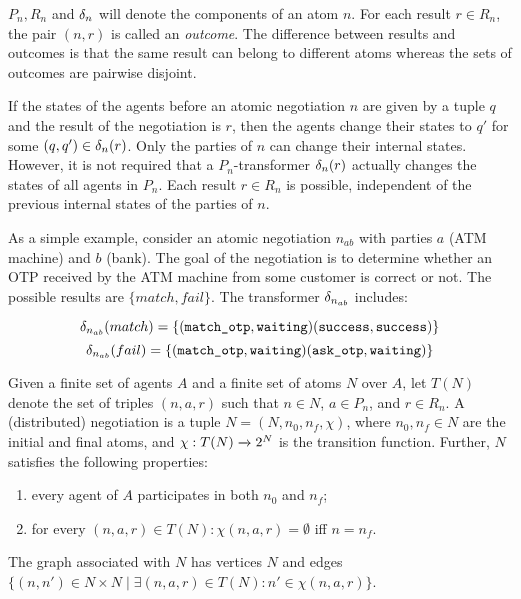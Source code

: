 $P_n, R_n$ and $\delta_n$ will denote the components of an atom $n$. For each result $r \in R_n$, the pair $(n, r)$ is called an \textit{outcome}. The diﬀerence between results and outcomes is that the same result can belong to diﬀerent atoms whereas the sets of outcomes are pairwise disjoint.

If the states of the agents before an atomic negotiation $n$ are given by a tuple $q$ and the result of the negotiation is $r$, then the agents change their states to $q'$ for some $(q, q') \in \delta_n(r)$. Only the parties of $n$ can change their internal states. However, it is not required that a $P_n$-transformer $\delta_n(r)$ actually changes the states of all agents in $P_n$. Each result $r \in R_n$ is possible, independent of the previous internal states of the parties of $n$.


As a simple example, consider an atomic negotiation $n_{ab}$ with parties $a$ (ATM machine) and $b$ (bank). The goal of the negotiation is to determine whether an OTP received by the ATM machine from some customer is correct or not. The possible results are $\{match, fail\}$. The transformer $\delta_{n_{ab}}$ includes: 

$$\delta_{n_{ab}}(match) = \{(\texttt{match\_otp}, \texttt{waiting}) (\texttt{success}, \texttt{success})\}$$
$$\delta_{n_{ab}}(fail) = \{(\texttt{match\_otp}, \texttt{waiting}) (\texttt{ask\_otp}, \texttt{waiting})\}$$



\begin{definition}
Given a finite set of agents $A$ and a finite set of atoms $N$ over $A$, let $T(N)$ denote the set of triples $(n, a, r)$ such that $n \in N$, $a \in P_n$, and $r \in R_n$. A (distributed) negotiation is a tuple $N = (N, n_0, n_f, \chi)$, where $n_0, n_f \in N$ are the initial and final atoms, and $\chi : T(N) \xrightarrow{} 2^N$ is the transition function. Further, $N$ satisfies the following properties:
\begin{enumerate}
	\item every agent of $A$ participates in both $n_0$ and $n_f$;
	\item for every $(n, a, r) \in T(N): \chi(n, a, r) = \emptyset$ iff $n = n_f$.
\end{enumerate}
The graph associated with $N$ has vertices $N$ and edges $\{(n, n') \in N \times N \mid \exists (n, a, r) \in T(N) : n' \in \chi(n, a, r)\}$.
\end{definition}

